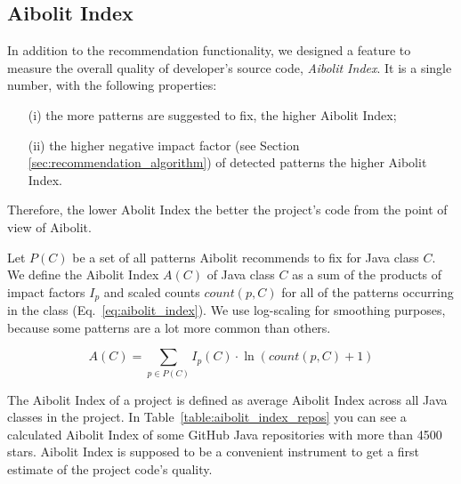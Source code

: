 \subsection{Aibolit Index}

In addition to the recommendation functionality, we designed a feature to measure the overall quality of developer's source code, \textit{Aibolit Index}.
It is a single number, with the following properties: 
\begin{itemize}
\item[(i)] the more patterns are suggested to fix, the higher Aibolit Index;
\item[(ii)] the higher negative impact factor (see Section \ref{sec:recommendation_algorithm}) 
of detected patterns the higher Aibolit Index.
\end{itemize}
Therefore, the lower Abolit Index the better the project's code from the point 
of view of Aibolit.

Let $P(C)$ be a set of all patterns Aibolit recommends to fix for Java class $C$.
We define the Aibolit Index $A(C)$ of Java class $C$ as a sum of the products of
impact factors $I_{p}$ and scaled counts $count(p, C)$ for all of the 
patterns occurring in the class (Eq.~\ref{eq:aibolit_index}). We use log-scaling for smoothing purposes, because some patterns are a lot more common than others.    


\begin{equation}
    A(C) = \sum_{p \in P(C)} { I_{p}(C) \cdot \ln{(count(p, C) + 1)} } \label{eq:aibolit_index}
\end{equation}


The Aibolit Index of a project is defined as average Aibolit Index
across all Java classes in the project. In Table~\ref{table:aibolit_index_repos} 
you can see a calculated Aibolit Index of some GitHub Java repositories with 
more than 4500 stars. Aibolit Index is supposed to be a convenient instrument
to get a first estimate of the project code's quality. 

